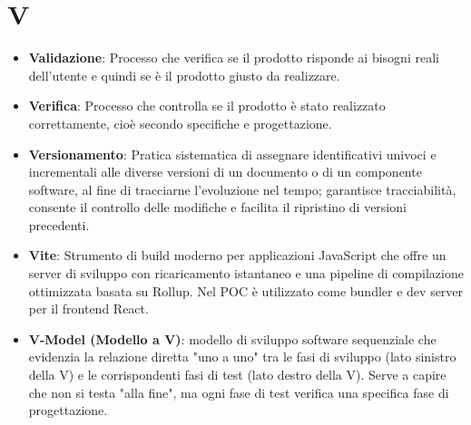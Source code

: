 \documentclass[11pt,a4paper]{article}
\begin{document}
\section*{V}
\begin{itemize}
\item \textbf{Validazione}: Processo che verifica se il prodotto risponde ai bisogni reali dell’utente e quindi se è il prodotto giusto da realizzare.

\item \textbf{Verifica}: Processo che controlla se il prodotto è stato realizzato correttamente, cioè secondo specifiche e progettazione.

\item \textbf{Versionamento}: Pratica sistematica di assegnare identificativi univoci e incrementali alle diverse versioni di un documento o di un componente software, al fine di tracciarne l'evoluzione nel tempo; garantisce tracciabilità, consente il controllo delle modifiche e facilita il ripristino di versioni precedenti.

\item \textbf{Vite}: Strumento di build moderno per applicazioni 
JavaScript che offre un server di sviluppo con ricaricamento 
istantaneo e una pipeline di compilazione ottimizzata basata 
su Rollup. Nel POC è utilizzato come bundler e dev server per 
il frontend React.

\item \textbf{V-Model (Modello a V)}: modello di sviluppo software sequenziale che evidenzia la relazione diretta "uno a uno" tra le fasi di sviluppo (lato sinistro della V) e le corrispondenti fasi di test (lato destro della V). Serve a capire che non si testa "alla fine", ma ogni fase di test verifica una specifica fase di progettazione.


\end{itemize}

\newpage
\end{document}
